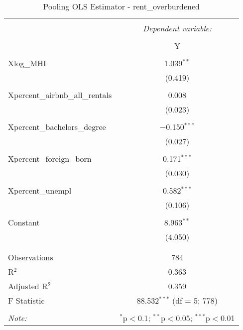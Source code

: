 \documentclass{article}
\begin{document}
\begin{table}[!htbp] \centering 
  \caption{Pooling OLS Estimator - rent\_overburdened} 
  \label{} 
  \begin{tabular}{@{\extracolsep{5pt}}lc} 
    \\[-1.8ex]\hline 
    \hline \\[-1.8ex] 
    & \multicolumn{1}{c}{\textit{Dependent variable:}} \\ 
    \cline{2-2} 
    \\[-1.8ex] & Y \\ 
    \hline \\[-1.8ex] 
    Xlog\_MHI & 1.039$^{**}$ \\ 
    & (0.419) \\ 
    & \\ 
    Xpercent\_airbnb\_all\_rentals & 0.008 \\ 
    & (0.023) \\ 
    & \\ 
    Xpercent\_bachelors\_degree & $-$0.150$^{***}$ \\ 
    & (0.027) \\ 
    & \\ 
    Xpercent\_foreign\_born & 0.171$^{***}$ \\ 
    & (0.030) \\ 
    & \\ 
    Xpercent\_unempl & 0.582$^{***}$ \\ 
    & (0.106) \\ 
    & \\ 
    Constant & 8.963$^{**}$ \\ 
    & (4.050) \\ 
    & \\ 
    \hline \\[-1.8ex] 
    Observations & 784 \\ 
    R$^{2}$ & 0.363 \\ 
    Adjusted R$^{2}$ & 0.359 \\ 
    F Statistic & 88.532$^{***}$ (df = 5; 778) \\ 
    \hline 
    \hline \\[-1.8ex] 
    \textit{Note:}  & \multicolumn{1}{r}{$^{*}$p$<$0.1; $^{**}$p$<$0.05; $^{***}$p$<$0.01} \\ 
  \end{tabular} 
\end{table} 
\end{document}
